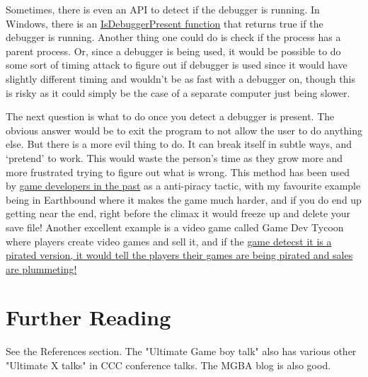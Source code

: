 \documentclass[twocolumn, a4paper,12pt]{article}
\begin{document}
Sometimes, there is even an API to detect if the debugger is running. In Windows, there is an \href{https://docs.microsoft.com/en-us/windows/win32/api/debugapi/nf-debugapi-isdebuggerpresent}{IsDebuggerPresent function} that returns true if the debugger is running. Another thing
one could do is check if the process has a parent process. Or, since a debugger is being used, it would be possible to do some sort
of timing attack to figure out if debugger is used since it would have slightly different timing and wouldn't be as fast with a debugger on,
though this is risky as it could simply be the case of a separate computer just being slower.

The next question is what to do once you detect a debugger is present. The obvious answer would be to exit the program to not allow the 
user to do anything else. But there is a more evil thing to do. It can break itself in subtle ways, and `pretend' to work. This
would waste the person's time as they grow more and more frustrated trying to figure out what is wrong. This method has been used
by \href{https://www.ign.com/articles/2013/04/29/eight-of-the-most-hilarious-anti-piracy-measures-in-video-games}{game developers in the past} as a anti-piracy tactic, with my favourite example being in Earthbound where it makes the game much harder, and if you do end up
getting near the end, right before the climax it would freeze up and delete your save file! Another excellent
example is a video game called Game Dev Tycoon where players create video games and sell it, and if the \href{https://www.greenheartgames.com/2013/04/29/what-happens-when-pirates-play-a-game-development-simulator-and-then-go-bankrupt-because-of-piracy/} {game detecst
it is a pirated version, it would tell the players their games are being pirated and sales are plummeting!}



\section{Further Reading}
See the References section.
The "Ultimate Game boy talk" also has various other "Ultimate X talks" in CCC conference talks.
The MGBA blog is also good.
\nocite{*}

\end{document}
